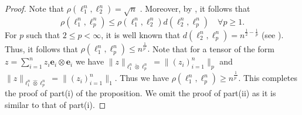 \documentclass[a4paper,oneside,11pt, reqno]{amsart}
\numberwithin{equation}{section}
\theoremstyle{plain}
\begin{document}
\begin{proof}
Note that $\rho(\ell_1^n,\ell_2^n)=\sqrt{n}$ \cite[Equation (59)]{XOR games and GT}. Moreover, by \cite[Proposition 12]{XOR games and GT}, it follows that 
\[\rho(\ell_1^n,\ell_p^n)\leqslant \rho(\ell_1^n,\ell_2^n)d(\ell_2^n,\ell_p^n) \quad \forall p\geqslant 1.\] 
For $p$ such that $2\leqslant p < \infty$,
it is well known that $d(\ell_2^n,\ell_p^n)=n^{\frac{1}{2}-\frac{1}{p}}$ (see \cite{HandbookI}). Thus, it follows that $\rho(\ell_1^n,\ell_p^n)\leqslant n^{\frac{1}{p^\prime}}.$ Note that for a tensor of the form $z=\sum_{i=1}^nz_i\mathbf{e}_i\otimes\mathbf{e}_i$ we have $\|z\|_{\ell_1^n\check{\otimes}\ell_p^n}=\|(z_i)_{i=1}^n\|_p$ and $\|z\|_{\ell_1^n\hat{\otimes}\ell_p^n}=\|(z_i)_{i=1}^n\|_1.$ Thus we have $\rho(\ell_1^n,\ell_p^n)\geqslant n^{\frac{1}{p^\prime}}.$ This completes the proof of part(i) of the proposition. We omit the proof of part(ii) as it is similar to that of part(i). 
\end{proof}
\end{document}
